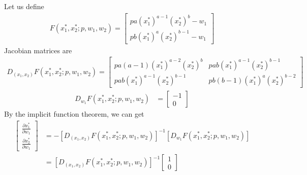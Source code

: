 \documentclass[11pt]{elegantbook}
\begin{document}
\begin{example}
    Let us define
    \begin{equation}
        \begin{aligned}
            F(x_1^*,x_2^*;p,w_1,w_2)=
            \begin{bmatrix}
                pa(x_1^*)^{a-1}(x_2^*)^b-w_1\\
                pb(x_1^*)^{a}(x_2^*)^{b-1}-w_1
            \end{bmatrix}
        \end{aligned}
        \nonumber
    \end{equation}
    Jacobian matrices are
    \begin{equation}
        \begin{aligned}
            D_{(x_1,x_2)}F(x_1^*,x_2^*;p,w_1,w_2)=\begin{bmatrix}
                pa(a-1)(x_1^*)^{a-2}(x_2^*)^b&pab(x_1^*)^{a-1}(x_2^*)^{b-1}\\
                pab(x_1^*)^{a-1}(x_2^*)^{b-1}&pb(b-1)(x_1^*)^{a}(x_2^*)^{b-2}
            \end{bmatrix}
        \end{aligned}
        \nonumber
    \end{equation}
    \begin{equation}
        \begin{aligned}
            D_{w_1}F(x_1^*,x_2^*;p,w_1,w_2)
            &=
            \begin{bmatrix}
                -1\\
                0
            \end{bmatrix}
        \end{aligned}
        \nonumber
    \end{equation}
    By the implicit function theorem, we can get
    \begin{equation}
        \begin{aligned}
            \begin{bmatrix}
                \frac{\partial x_1^*}{\partial w_1}\\
                \frac{\partial x_2^*}{\partial w_1}
            \end{bmatrix}&=-[D_{(x_1,x_2)}F(x_1^*,x_2^*;p,w_1,w_2)]^{-1}[D_{w_1}F(x_1^*,x_2^*;p,w_1,w_2)]\\
            &=[D_{(x_1,x_2)}F(x_1^*,x_2^*;p,w_1,w_2)]^{-1}\begin{bmatrix}
                1\\
                0
            \end{bmatrix}
        \end{aligned}
        \nonumber
    \end{equation}
\end{example}
\end{document}
